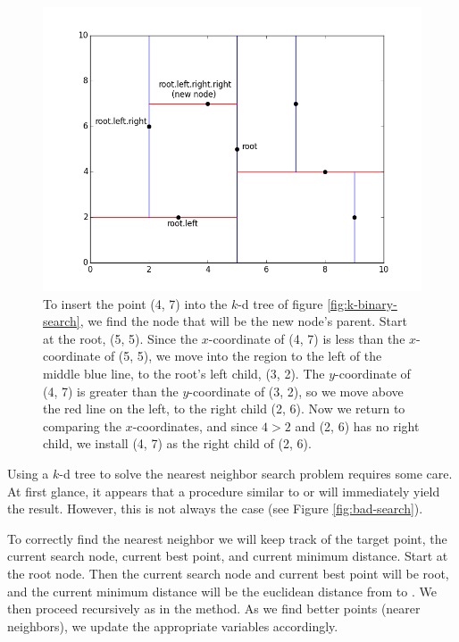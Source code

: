 \begin{figure}[H]
\includegraphics[width=\textwidth]{kdpic2.png}
\caption{To insert the point (4, 7) into the $k$-d tree of figure \ref{fig:k-binary-search}, we find the node that will be the new node's parent. Start at the root, (5, 5). Since the $x$-coordinate of (4, 7) is less than the $x$-coordinate of (5, 5), we move into the region to the left of the middle blue line, to the root's left child, (3, 2). The $y$-coordinate of (4, 7) is greater than the $y$-coordinate of (3, 2), so we move above the red line on the left, to the right child (2, 6). Now we return to comparing the $x$-coordinates, and since $4 > 2$ and (2, 6) has no right child, we install (4, 7) as the right child of (2, 6).}
\label{fig:k-insert}
\end{figure}

Using a $k$-d tree to solve the nearest neighbor search problem requires some care.
At first glance, it appears that a procedure similar to  or  will immediately yield the result.
However, this is not always the case (see Figure \ref{fig:bad-search}).

To correctly find the nearest neighbor we will keep track of the target point, the current search node, current best point, and current minimum distance.
Start at the root node.
Then the current search node and current best point will be root, and the current minimum distance will be the euclidean distance from  to .
We then proceed recursively as in the  method.
As we find better points (nearer neighbors), we update the appropriate variables accordingly.

